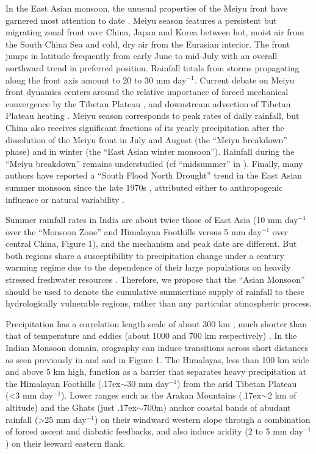 \documentclass[12pt]{article}
\newcommand{\mytilde}{\raise.17ex\hbox{$\scriptstyle\mathtt{\sim}$}}	%
\begin{document}
	In the East Asian monsoon, the unusual properties of the Meiyu front have garnered most attention to date \citep{Ding2005}. Meiyu season features a persistent but migrating zonal front over China, Japan and Korea between hot, moist air from the South China Sea and cold, dry air from the Eurasian interior. The front jumps in latitude frequently from early June to mid-July with an overall northward trend in preferred position. Rainfall totals from storms propagating along the front axis amount to 20 to 30 mm day$^{-1}$. Current debate on Meiyu front dynamics centers around the relative importance of forced mechanical convergence by the Tibetan Plateau \citep{Molnar2010,Chen2014}, and downstream advection of Tibetan Plateau heating \citep{Sampe2010}. Meiyu season corresponds to peak rates of daily rainfall, but China also receives significant fractions of its yearly precipitation after the dissolution of the Meiyu front in July and August (the ``Meiyu breakdown'' phase) and in winter (the ``East Asian winter monsoon''). Rainfall during the ``Meiyu breakdown'' remains understudied (cf ``midsummer'' in \cite{Kosaka2011}). Finally, many authors have reported a ``South Flood North Drought'' trend in the East Asian summer monsoon since the late 1970s \citep{Gong2002,Ding2008}, attributed either to anthropogenic influence or natural variability \citep{Song2014,Lei2014}.
	
	Summer rainfall rates in India are about twice those of East Asia (10 mm day$^{-1}$ over the ``Monsoon Zone'' and Himalayan Foothills versus 5 mm day$^{-1}$ over central China, Figure 1), and the mechanism and peak date are different. But both regions share a susceptibility to precipitation change under a  century warming regime due to the dependence of their large populations on heavily stressed freshwater resources \citep{Gleeson2012}. Therefore, we propose that the ``Asian Monsoon'' should be used to denote the cumulative summertime supply of rainfall to these hydrologically vulnerable regions, rather than any particular atmospheric process.
	
	Precipitation has a correlation length scale of about 300 km \citep{Dai1997}, much shorter than that of temperature and eddies (about 1000 and 700 km respectively) \citep{Hansen1987,Barnes2012}. In the Indian Monsoon domain, orography can induce transitions across short distances as seen previously in \cite{Xie2006} and \cite{Biasutti2011} and in Figure 1. The Himalayas, less than 100 km wide and above 5 km high, function as a barrier that separates heavy precipitation at the Himalayan Foothills (\mytilde30 mm day$^{-1}$) from the arid Tibetan Plateau (\textless 3 mm day$^{-1}$). Lower ranges such as the Arakan Mountains (\mytilde2 km of altitude) and the Ghats (just \mytilde700m) anchor coastal bands of abudant rainfall (\textgreater25 mm day$^{-1}$) on their windward western slope through a combination of forced ascent and diabatic feedbacks, and also induce aridity (2 to 5 mm day$^{-1}$) on their leeward eastern flank. 
	
\end{document}
